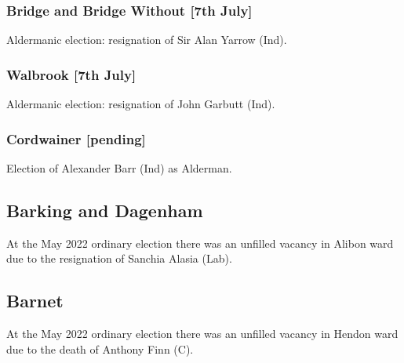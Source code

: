 \documentclass[a4paper,openany]{book}
\begin{document}
\begin{resultsiii}
\subsubsection*{Bridge and Bridge Without \hspace*{\fill}\nolinebreak[1]%
	\enspace\hspace*{\fill}
	[7th July]}


Aldermanic election: resignation of Sir Alan Yarrow (Ind).

\subsubsection*{Walbrook \hspace*{\fill}\nolinebreak[1]%
	\enspace\hspace*{\fill}
	[7th July]}


Aldermanic election: resignation of John Garbutt (Ind).

\subsubsection*{Cordwainer \hspace*{\fill}\nolinebreak[1]%
	\enspace\hspace*{\fill}
	[pending]}


Election of Alexander Barr (Ind) as Alderman.

\subsection*{Barking and Dagenham}

At the May 2022 ordinary election there was an unfilled vacancy in Alibon ward due to the resignation of Sanchia Alasia (Lab).%

\subsection*{Barnet}

At the May 2022 ordinary election there was an unfilled vacancy in Hendon ward due to the death of Anthony Finn (C).%


\end{resultsiii}
\end{document}
